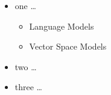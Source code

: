 \documentclass{article}
\begin{document}
\begin{itemize} 
\item one \dots{}
     \begin{itemize} 
        \item Language Models
        \item Vector Space Models
     \end{itemize}
\item two \dots{}
\item three \dots{}
\end{itemize}
\end{document}
